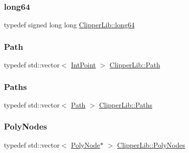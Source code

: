 \mbox{\label{namespace_clipper_lib_a7fd564bf34d174b6c96e07d01e5e7a0a}} 
\subsubsection{\texorpdfstring{long64}{long64}}
{\footnotesize\ttfamily typedef signed long long \mbox{\hyperlink{namespace_clipper_lib_a7fd564bf34d174b6c96e07d01e5e7a0a}{Clipper\+Lib\+::long64}}}

\mbox{\label{namespace_clipper_lib_af39c8fe00f278f18cc8142fef41242da}} 
\subsubsection{\texorpdfstring{Path}{Path}}
{\footnotesize\ttfamily typedef std\+::vector$<$ \mbox{\hyperlink{struct_clipper_lib_1_1_int_point}{Int\+Point}} $>$ \mbox{\hyperlink{namespace_clipper_lib_af39c8fe00f278f18cc8142fef41242da}{Clipper\+Lib\+::\+Path}}}

\mbox{\label{namespace_clipper_lib_a4bab1d9e10805fa6f1fd3b78c56efcfe}} 
\subsubsection{\texorpdfstring{Paths}{Paths}}
{\footnotesize\ttfamily typedef std\+::vector$<$ \mbox{\hyperlink{namespace_clipper_lib_af39c8fe00f278f18cc8142fef41242da}{Path}} $>$ \mbox{\hyperlink{namespace_clipper_lib_a4bab1d9e10805fa6f1fd3b78c56efcfe}{Clipper\+Lib\+::\+Paths}}}

\mbox{\label{namespace_clipper_lib_ac9381bbff6b966df41b78667385b9c1e}} 
\subsubsection{\texorpdfstring{PolyNodes}{PolyNodes}}
{\footnotesize\ttfamily typedef std\+::vector$<$ \mbox{\hyperlink{class_clipper_lib_1_1_poly_node}{Poly\+Node}}$\ast$ $>$ \mbox{\hyperlink{namespace_clipper_lib_ac9381bbff6b966df41b78667385b9c1e}{Clipper\+Lib\+::\+Poly\+Nodes}}}


